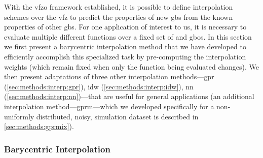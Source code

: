 \documentclass[final,twocolumn,12pt]{elsarticle}
\begin{document}
With the \gls{vfzo} framework established, it is possible to define interpolation schemes over the \gls{vfz} to predict the properties of new \glspl{gb} from the known properties of other \glspl{gb}. For one application of interest to us, it is necessary to evaluate multiple different functions over a fixed set of \inpt{} and \outpt{} \glspl{gbo}. In this section we first present a barycentric interpolation method that we have developed to efficiently accomplish this specialized task by pre-computing the interpolation weights (which remain fixed when only the function being evaluated changes). We then present adaptations of three other interpolation methods---\gls{gpr} (\cref{sec:methods:interp:gpr}), \gls{idw} (\cref{sec:methods:interp:idw}), \gls{nn} (\cref{sec:methods:interp:nn})---that are useful for general applications (an additional interpolation method---\gls{gprm}---which we developed specifically for a non-uniformly distributed, noisy, simulation dataset is described in \cref{sec:methods:gprmix}). %

\subsubsection{Barycentric Interpolation}
\label{sec:methods:interp:bary}


\end{document}
